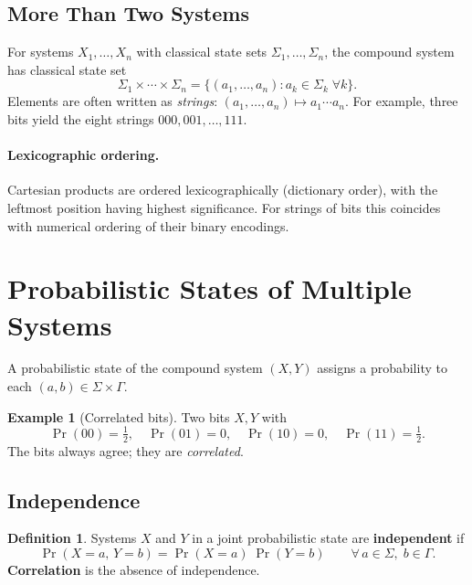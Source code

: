 \documentclass[11pt]{article}
\theoremstyle{definition}
\newtheorem{definition}{Definition}[section]
\newtheorem{example}{Example}[section]
\begin{document}
\subsection{More Than Two Systems}

For systems $X_1,\dots,X_n$ with classical state sets $\Sigma_1,\dots,\Sigma_n$, the compound system has classical state set
\[
    \Sigma_1\times\cdots\times\Sigma_n
    = \bigl\{(a_1,\dots,a_n) : a_k\in\Sigma_k\;\forall k\bigr\}.
\]
Elements are often written as \emph{strings}: $(a_1,\dots,a_n)\mapsto a_1\cdots a_n$.  For example, three bits yield the eight strings $000,001,\dots,111$.

\paragraph{Lexicographic ordering.}
Cartesian products are ordered lexicographically (dictionary order), with the leftmost position having highest significance.  For strings of bits this coincides with numerical ordering of their binary encodings.

\section{Probabilistic States of Multiple Systems}

A probabilistic state of the compound system $(X,Y)$ assigns a probability to each $(a,b)\in\Sigma\times\Gamma$.

\begin{example}[Correlated bits]
Two bits $X,Y$ with
\[
    \Pr(00)=\tfrac{1}{2},\quad \Pr(01)=0,\quad \Pr(10)=0,\quad \Pr(11)=\tfrac{1}{2}.
\]
The bits always agree; they are \emph{correlated}.
\end{example}

\subsection{Independence}

\begin{definition}
Systems $X$ and $Y$ in a joint probabilistic state are \textbf{independent} if
\[
    \Pr(X=a,\,Y=b) = \Pr(X=a)\;\Pr(Y=b)
    \qquad\forall\,a\in\Sigma,\;b\in\Gamma.
\]
\textbf{Correlation} is the absence of independence.
\end{definition}
\end{document}
